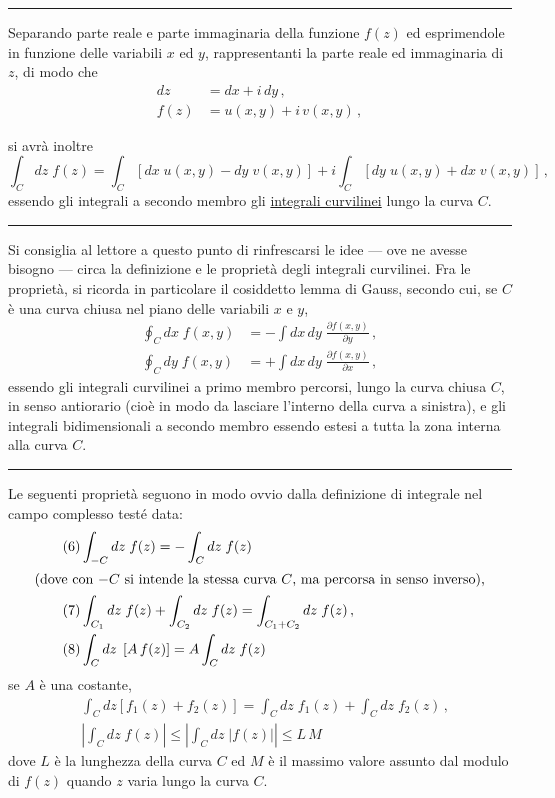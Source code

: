 \documentclass[11pt, a4paper]{book}
\numberwithin{equation}{section}
\begin{document}
\noindent\rule{\linewidth}{0.4pt}

Separando parte reale e parte immaginaria della funzione $f(z)$ ed esprimendole in funzione delle variabili $x$ ed $y$, rappresentanti la parte reale ed immaginaria di $z$, di modo che
\begin{align}
dz &= dx + i\,dy\,, \tag{3}\\
f(z) &= u(x,y) + i\,v(x,y)\,, \tag{4}
\end{align}


si avrà inoltre
\begin{equation}
\int_C dz\;f(z) = \int_C \left[dx\;u(x,y) - dy\;v(x,y)\right] + i\int_C\left[dy\;u(x,y) + dx\;v(x,y)\right]\,, \tag{5}
\end{equation}
essendo gli integrali a secondo membro gli \uline{integrali curvilinei} lungo la curva $C$.

\noindent\rule{\linewidth}{0.4pt}

Si consiglia al lettore a questo punto di rinfrescarsi le idee --- ove ne avesse bisogno --- circa la definizione e le proprietà degli integrali curvilinei. Fra le proprietà, si ricorda in particolare il cosiddetto lemma di Gauss, secondo cui, se $C$ è una curva chiusa nel piano delle variabili $x$ e $y$,
\begin{align*}
\oint_C dx\; f(x,y) &= -\int dx\,dy\;\frac{\partial f(x,y)}{\partial y}\,, \\
\oint_C dy\; f(x,y) &= +\int dx\,dy\;\frac{\partial f(x,y)}{\partial x}\,,
\end{align*}
essendo gli integrali curvilinei a primo membro percorsi, lungo la curva chiusa $C$, in senso antiorario (cioè in modo da lasciare l'interno della curva a sinistra), e gli integrali bidimensionali a secondo membro essendo estesi a tutta la zona interna alla curva $C$.

\noindent\rule{\linewidth}{0.4pt}

Le seguenti proprietà seguono in modo ovvio dalla definizione di integrale nel campo complesso testé data:
\begin{align}
\tag{6} &\int_{-C} dz\; f(z) = -\int_C dz\; f(z) \\
\intertext{(dove con $-C$ si intende la stessa curva $C$, ma percorsa in senso inverso),}
\tag{7} &\int_{C_1} dz\; f(z) + \int_{C_2} dz\; f(z) = \int_{C_1+C_2} dz\; f(z)\,, \\
\tag{8} &\int_C dz\;\left[A\,f(z)\right] = A\int_C dz\; f(z)
\end{align}
se $A$ è una costante,
\begin{align}
\tag{9} &\int_C dz\left[f_1(z) + f_2(z)\right] = \int_C dz\; f_1(z) + \int_C dz\; f_2(z)\,, \\
\tag{10} &\left|\int_C dz\; f(z)\right| \leq \left|\int_C dz\;|f(z)|\right| \leq L\,M
\end{align}
dove $L$ è la lunghezza della curva $C$ ed $M$ è il massimo valore assunto dal modulo di $f(z)$ quando $z$ varia lungo la curva $C$.
\end{document}
